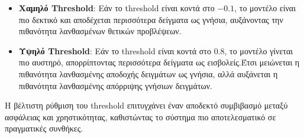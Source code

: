 \begin{itemize}
    \item \textbf{Χαμηλό Threshold}: Εάν το threshold είναι κοντά στο \(-0.1\), το μοντέλο είναι πιο δεκτικό και αποδέχεται περισσότερα δείγματα ως γνήσια, αυξάνοντας την πιθανότητα λανθασμένων θετικών προβλέψεων.
    \item \textbf{Υψηλό Threshold}: Εάν το threshold είναι κοντά στο \(0.8\), το μοντέλο γίνεται πιο αυστηρό, απορρίπτοντας περισσότερα δείγματα ως εισβολείς.Έτσι μειώνεται η πιθανότητα λανθασμένης αποδοχής δειγμάτων ως γνήσια, αλλά αυξάνεται η πιθανότητα λανθασμένης απόρριψης γνήσιων δειγμάτων.
\end{itemize}

Η βέλτιστη ρύθμιση του threshold επιτυγχάνει έναν αποδεκτό συμβιβασμό μεταξύ ασφάλειας και χρηστικότητας, καθιστώντας το σύστημα πιο αποτελεσματικό σε πραγματικές συνθήκες.

